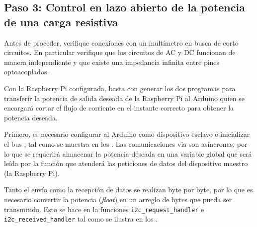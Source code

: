 %
%

\subsection{Paso 3: Control en lazo abierto de la potencia de una carga resistiva}%
\label{sec:step3}
Antes de proceder, verifique conexiones con un multímetro en busca de corto circuitos.
En particular verifique que los circuitos de AC y DC funcionan de manera independiente y que existe una impedancia infinita entre pines optoacoplados.

Con la Raspberry Pi configurada, basta con generar los dos programas para transferir la potencia de salida deseada de la Raspberry Pi al Arduino quien se encargará cortar el flujo de corriente en el instante correcto para obtener la potencia deseada.

Primero, es necesario configurar al Arduino como dispositivo esclavo e inicializar el bus \IIC, tal como se muestra en los .
Las comunicaciones via \IIC son asíncronas, por lo que se requerirá almacenar la potencia deseada en una variable global que será leída por la función que atenderá las peticiones de datos del dispositivo maestro (la Raspberry Pi).





Tanto el envío como la recepción de datos se realizan byte por byte, por lo que es necesario convertir la potencia (\emph{float}) en un arreglo de bytes que pueda ser transmitido.
Esto se hace en la funciones \texttt{i2c\_request\_handler} e \texttt{i2c\_received\_handler} tal como se ilustra en los .




